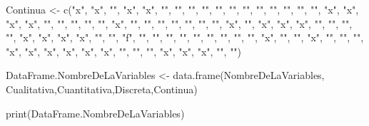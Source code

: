 \documentclass[
]{article}
\newenvironment{Shaded}{\begin{snugshade}}{\end{snugshade}}
\newcommand{\FunctionTok}[1]{\textcolor[rgb]{0.00,0.00,0.00}{#1}}
\newcommand{\NormalTok}[1]{#1}
\newcommand{\OtherTok}[1]{\textcolor[rgb]{0.56,0.35,0.01}{#1}}
\newcommand{\StringTok}[1]{\textcolor[rgb]{0.31,0.60,0.02}{#1}}
\begin{document}
\begin{Shaded}
\begin{Highlighting}[]
\NormalTok{Continua }\OtherTok{\textless{}{-}} \FunctionTok{c}\NormalTok{(}\StringTok{"x"}\NormalTok{, }\StringTok{"x"}\NormalTok{, }\StringTok{""}\NormalTok{, }\StringTok{"x"}\NormalTok{, }\StringTok{"x"}\NormalTok{, }\StringTok{""}\NormalTok{, }\StringTok{""}\NormalTok{, }\StringTok{""}\NormalTok{, }\StringTok{""}\NormalTok{, }\StringTok{""}\NormalTok{, }\StringTok{""}\NormalTok{, }\StringTok{""}\NormalTok{, }\StringTok{""}\NormalTok{, }\StringTok{""}\NormalTok{, }\StringTok{""}\NormalTok{, }\StringTok{""}\NormalTok{, }\StringTok{""}\NormalTok{, }\StringTok{"x"}\NormalTok{, }\StringTok{"x"}\NormalTok{, }\StringTok{"x"}\NormalTok{, }\StringTok{"x"}\NormalTok{, }\StringTok{""}\NormalTok{, }\StringTok{""}\NormalTok{, }\StringTok{""}\NormalTok{, }\StringTok{""}\NormalTok{, }\StringTok{""}\NormalTok{, }\StringTok{"x"}\NormalTok{, }\StringTok{""}\NormalTok{, }\StringTok{""}\NormalTok{, }\StringTok{""}\NormalTok{, }\StringTok{""}\NormalTok{, }\StringTok{""}\NormalTok{, }\StringTok{""}\NormalTok{, }\StringTok{""}\NormalTok{, }\StringTok{"x"}\NormalTok{, }\StringTok{""}\NormalTok{, }\StringTok{"x"}\NormalTok{, }\StringTok{"x"}\NormalTok{, }\StringTok{"x"}\NormalTok{, }\StringTok{""}\NormalTok{, }\StringTok{""}\NormalTok{, }\StringTok{""}\NormalTok{, }\StringTok{""}\NormalTok{, }\StringTok{"x"}\NormalTok{, }\StringTok{"x"}\NormalTok{, }\StringTok{"x"}\NormalTok{, }\StringTok{"x"}\NormalTok{, }\StringTok{""}\NormalTok{, }\StringTok{""}\NormalTok{, }\StringTok{"f"}\NormalTok{, }\StringTok{""}\NormalTok{, }\StringTok{""}\NormalTok{, }\StringTok{""}\NormalTok{, }\StringTok{""}\NormalTok{, }\StringTok{""}\NormalTok{, }\StringTok{""}\NormalTok{, }\StringTok{""}\NormalTok{, }\StringTok{""}\NormalTok{, }\StringTok{""}\NormalTok{, }\StringTok{"x"}\NormalTok{, }\StringTok{""}\NormalTok{, }\StringTok{""}\NormalTok{, }\StringTok{"x"}\NormalTok{, }\StringTok{""}\NormalTok{, }\StringTok{""}\NormalTok{, }\StringTok{""}\NormalTok{, }\StringTok{"x"}\NormalTok{, }\StringTok{"x"}\NormalTok{, }\StringTok{"x"}\NormalTok{, }\StringTok{"x"}\NormalTok{, }\StringTok{"x"}\NormalTok{, }\StringTok{"x"}\NormalTok{, }\StringTok{""}\NormalTok{, }\StringTok{""}\NormalTok{, }\StringTok{""}\NormalTok{, }\StringTok{"x"}\NormalTok{, }\StringTok{"x"}\NormalTok{, }\StringTok{"x"}\NormalTok{, }\StringTok{""}\NormalTok{, }\StringTok{""}\NormalTok{)}



\NormalTok{DataFrame.NombreDeLaVariables }\OtherTok{\textless{}{-}} \FunctionTok{data.frame}\NormalTok{(NombreDeLaVariables, Cualitativa,Cuantitativa,Discreta,Continua)}

\FunctionTok{print}\NormalTok{(DataFrame.NombreDeLaVariables)}
\end{Highlighting}
\end{Shaded}
\end{document}

